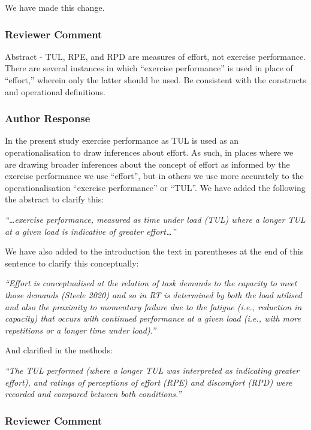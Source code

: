 \documentclass[
  letterpaper,
  DIV=11,
  numbers=noendperiod]{scrartcl}
\begin{document}
We have made this change.

\hypertarget{reviewer-comment-1}{%
\subsubsection{Reviewer Comment}\label{reviewer-comment-1}}

Abstract - TUL, RPE, and RPD are measures of effort, not exercise
performance. There are several instances in which ``exercise
performance'' is used in place of ``effort,'' wherein only the latter
should be used. Be consistent with the constructs and operational
definitions.

\hypertarget{author-response-1}{%
\subsubsection{Author Response}\label{author-response-1}}

In the present study exercise performance as TUL is used as an
operationalisation to draw inferences about effort. As such, in places
where we are drawing broader inferences about the concept of effort as
informed by the exercise performance we use ``effort'', but in others we
use more accurately to the operationalisation ``exercise performance''
or ``TUL''. We have added the following the abstract to clarify this:

\emph{``\ldots exercise performance, measured as time under load (TUL)
where a longer TUL at a given load is indicative of greater
effort\ldots{}''}

We have also added to the introduction the text in parentheses at the
end of this sentence to clarify this conceptually:

\emph{``Effort is conceptualised at the relation of task demands to the
capacity to meet those demands (Steele 2020) and so in RT is determined
by both the load utilised and also the proximity to momentary failure
due to the fatigue (i.e., reduction in capacity) that occurs with
continued performance at a given load (i.e., with more repetitions or a
longer time under load).''}

And clarified in the methods:

\emph{``The TUL performed (where a longer TUL was interpreted as
indicating greater effort), and ratings of perceptions of effort (RPE)
and discomfort (RPD) were recorded and compared between both
conditions.''}

\hypertarget{reviewer-comment-2}{%
\subsubsection{Reviewer Comment}\label{reviewer-comment-2}}
\end{document}
